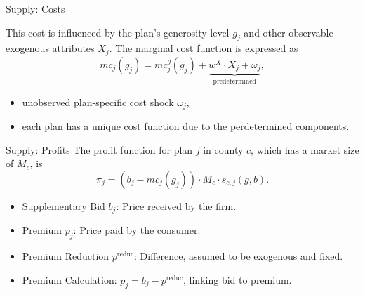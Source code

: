 \documentclass[professionalfonts, aspectratio=169]{beamer}
\begin{document}
\begin{frame}{Supply: Costs}

  This cost is influenced by the plan's generosity level $g_j$ and other observable exogenous attributes $X_j$. The marginal cost function is expressed as
  \begin{equation}
    \label{eq:marginal_cost}
    mc_j(g_j) = mc_j^g(g_j) + \underbrace{w^X \cdot X_j + \omega_j}_{\text{predetermined}},
  \end{equation}
  \begin{itemize}\small
    \item unobserved plan-specific cost shock $\omega_j$,
    \item each plan has a unique cost function due to the perdetermined components.
  \end{itemize}

\end{frame}

\begin{frame}{Supply: Profits}
  The profit function for plan $j$ in county $c$, which has a market size of $M_c$, is
  \begin{equation}
      \pi_j = (b_j - mc_j(g_j)) \cdot M_c \cdot s_{c,j}(g, b).
  \end{equation}

  \begin{itemize}\small
    \item Supplementary Bid  $b_j$: Price received by the firm.
    \item Premium $p_j$:  Price paid by the consumer.
    \item Premium Reduction $p^\text{reduc}$: Difference, assumed to be exogenous and fixed.
    \item Premium Calculation: \( p_j = b_j - p^\text{reduc} \), linking  bid to premium.
  \end{itemize}

\end{frame}
\end{document}
